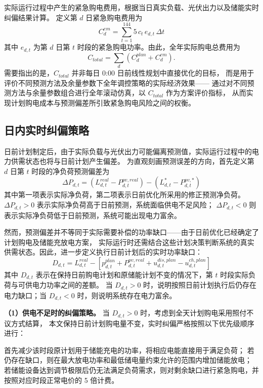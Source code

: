 实际运行过程中产生的紧急购电费用，根据当日真实负载、光伏出力以及储能实时纠偏结果计算。
定义第 $d$ 日紧急购电费用为
\begin{equation}
C^{em}_{d}=\sum_{t=1}^{144} 5\,c_t\,e_{d,t}\,\Delta t
\end{equation}
其中 $e_{d,t}$ 为第 $d$ 日第 $t$ 时段的紧急购电功率。由此，全年实际购电总费用为
\begin{equation}
C_{total}=\sum_{d}\left(C^{plan}_{d}+C^{em}_{d}\right).
\end{equation}
需要指出的是，$C_{total}$ 并非每日 0:00 日前线性规划中直接优化的目标，
而是用于评价不同预测方法及余量参数下全年调控策略的实际经济效果——
通过对不同预测方法与余量参数组合进行全年滚动仿真，以 $C_{total}$ 作为方案评价指标，
从而实现计划购电成本与预测偏差所引致紧急购电风险之间的权衡。

\subsection{日内实时纠偏策略}
日前计划制定后，由于实际负载与光伏出力可能偏离预测值，实际运行过程中的电力供需状态也将与日前计划产生偏差。
为直观刻画预测误差的方向，首先定义第 $d$ 日第 $t$ 时段的净负荷预测偏差为
\begin{equation}
\Delta P_{d,t}=\left(L^{real}_{d,t}-P^{pv,real}_{d,t}\right)-\left(L^{*}_{d,t}-P^{pv,*}_{d,t}\right)
\end{equation}
其中第一项表示实际净负荷，第二项表示日前优化所采用的修正预测净负荷。
$\Delta P_{d,t}>0$ 表示实际净负荷高于日前预测，系统面临供电不足风险；
$\Delta P_{d,t}<0$ 则表示实际净负荷低于日前预测，系统可能出现电力富余。

然而，预测偏差并不等同于实际需要补偿的功率缺口——由于日前优化已经确定了计划购电及储能充放电方案，
实际运行时还需结合这些计划决策判断系统的真实供需状态。因此，进一步定义执行日前计划后的实时功率缺口：
\begin{equation}
D_{d,t}=L^{real}_{d,t}-\left[p^{plan}_{d,t}+P^{pv,real}_{d,t}+u^{dis,plan}_{d,t}-u^{ch,plan}_{d,t}\right]
\end{equation}
其中 $D_{d,t}$ 表示在保持日前购电计划和原储能计划不变的情况下，第 $t$ 时段实际负荷与可供电力功率之间的差额。
当 $D_{d,t}>0$ 时，说明按照日前计划执行后仍存在电力缺口；当 $D_{d,t}<0$ 时，则说明系统存在电力富余。

\textbf{（1）供电不足时的纠偏策略。} 当 $D_{d,t}>0$ 时，考虑到全天计划购电采用照付不议方式结算，
本文保持日前计划购电量不变，实时纠偏严格按照以下优先级顺序进行：
\begin{center}
\end{center}
首先减少该时段原计划用于储能充电的功率，将相应电能直接用于满足负荷；
若仍存在缺口，则在最大放电功率和最低储电量约束允许的范围内增加储能放电；
若储能设备达到调节极限后仍无法满足负荷需求，则对剩余缺口进行紧急购电，并按照对应时段正常电价的 5 倍计费。

